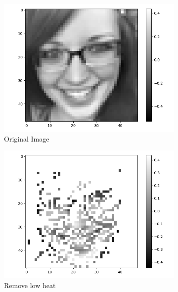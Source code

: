 \documentclass[fleqn,a4paper,12pt]{article}
\begin{document}
\begin{figure}[H]
\centering
\begin{subfigure}{.33\textwidth}
  \centering
  \includegraphics[width=\linewidth]{report-imgs/sa-orig.png}
  \caption{Original Image}
  \label{fig:sub1}
\end{subfigure}%
\begin{subfigure}{.33\textwidth}
  \centering
  \includegraphics[width=\linewidth]{report-imgs/sa-rm-low-heat.png}
  \caption{Remove low heat}
  \label{fig:sub2}
\end{subfigure}
\begin{subfigure}{.33\textwidth}
  \centering  

\end{subfigure}
\end{figure}
\end{document}
